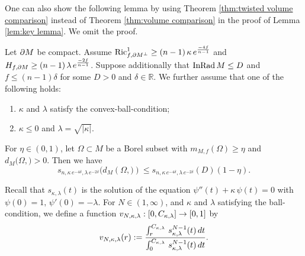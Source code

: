 One can also show the following lemma by using Theorem \ref{thm:twisted volume comparison} instead of Theorem \ref{thm:volume comparison} in the proof of Lemma \ref{lem:key lemma}.
We omit the proof.
\begin{lem}\label{lem:twisted key lemma}
Let $\partial M$ be compact.
Assume $\operatorname{Ric}^{1}_{f,\partial M^{\perp}}\geq (n-1) \,\kappa \,e^{\frac{-4f}{n-1}}$ and $H_{f,\partial M}\geq (n-1)\,\lambda\,e^{\frac{-2f}{n-1}}$.
Suppose additionally that
$\operatorname{InRad} M\leq D$ and $f\leq (n-1) \delta$ for some $D>0$ and $\delta \in \mathbb{R}$.
We further assume that
one of the following holds:
\begin{enumerate}
\item $\kappa$ and $\lambda$ satisfy the convex-ball-condition;
\item $\kappa \leq 0$ and $\lambda=\sqrt{\vert \kappa \vert}$.
\end{enumerate}
For $\eta \in (0,1)$,
let $\Omega \subset M$ be a Borel subset with $m_{M,f}(\Omega)\geq \eta$ and $d_{M}(\Omega,\bm)>0$.
Then we have
\begin{equation*}
s_{n,\kappa\,e^{-4\delta},\lambda\,e^{-2\delta}}(d_{M}(\Omega,\bm)) \leq s_{n,\kappa\,e^{-4\delta},\lambda\,e^{-2\delta}}(D)(1-\eta).
\end{equation*} 
\end{lem}

Recall that
$s_{\kappa,\lambda}(t)$ is the solution of the equation $\psi''(t)+\kappa\, \psi(t)=0$ with $\psi(0)=1,\,\psi'(0)=-\lambda$.
For $N \in (1,\infty)$,
and $\kappa$ and $\lambda$ satisfying the ball-condition,
we define a function $v_{N,\kappa,\lambda}:[0,C_{\kappa,\lambda}]\to [0,1]$ by
\begin{equation}\label{eq:ball function}
v_{N,\kappa,\lambda}(r):=\frac{\int^{C_{\kappa,\lambda}}_{r}\,s^{N-1}_{\kappa,\lambda}(t)\,dt}{\int^{C_{\kappa,\lambda}}_{0}\,s^{N-1}_{\kappa,\lambda}(t)\,dt}.
\end{equation}

